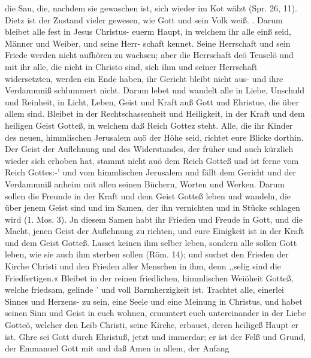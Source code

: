 die Sau, die, nachdem sie gewaschen ist, sich wieder im Kot
wälzt (Spr. 26, 11). Dietz ist der Zustand vieler gewesen, wie
Gott und sein Volk weiß. .
Darum bleibet alle fest in Jesus Christus- euerm Haupt, in
welchem ihr alle einß seid, Männer und Weiber, und seine Herr-
schaft kennet. Seine Herrschaft und sein Friede werden nicht
aufhören zu wachsen; aber die Herrschaft deö Teuselö und mit
ihr alle, die nicht in Christo sind, sich ihm und seiner Herrschaft
widersetzten, werden ein Ende haben, ihr Gericht bleibt nicht aus-
und ihre Verdammniß schlummert nicht. Darum lebet und
wandelt alle in Liebe, Unschuld und Reinheit, in Licht, Leben,
Geist und Kraft auß Gott und Ehristue, die über allem sind.
Bleibet in der Rechtschassenheit und Heiligkeit, in der Kraft und
dem heiligen Geist Gotteß, in welchem daß Reich Gottez steht.
Alle, die ihr Kinder des neuen, himmlischen Jerusalem auö der
Höhe seid, richtet eure Blicke dorthin.
Der Geist der Auflehnung und des Widerstandes, der früher
und auch kürzlich wieder sich erhoben hat, stammt nicht auö dem
Reich Gotteß und ist ferne vom Reich Gottes:-’ und vom himmlischen
Jerusalem und fällt dem Gericht und der Verdammniß anheim
mit allen seinen Büchern, Worten und Werken. Darum sollen
die Freunde in der Kraft und dem Geist Gotteß leben und wandeln,
die über jenem Geist sind und im Samen, der ihn vernichten und
in Stücke schlagen wird (1. Mos. 3). Jn diesem Samen habt ihr
Frieden und Freude in Gott, und die Macht, jenen Geist der
Auflehnung zu richten, und eure Einigkeit ist in der Kraft und
dem Geist Gotteß.
Lasset keinen ihm selber leben, sondern alle sollen Gott
leben, wie sie auch ihm sterben sollen (Röm. 14); und suchet den
Frieden der Kirche Christi und den Frieden aller Menschen in
ihm, denn ,,selig sind die Friedfertigen.« Bleibet in der reinen
friedlichen, himmlischen Weiöheit Gotteß, welche friedsam, gelinde
’ und voll Barmherzigkeit ist. Trachtet alle, einerlei Sinnes und
Herzens- zu sein, eine Seele und eine Meinung in Christus,
und habet seinen Sinn und Geist in euch wohnen, ermuntert
euch untereinander in der Liebe Gotteö, welcher den Leib Christi,
seine Kirche, erbauet, deren heiligeß Haupt er ist. Ghre sei Gott
durch Ehristuß, jetzt und immerdar; er ist der Felß und Grund,
der Emmanuel Gott mit und daß Amen in allem, der Anfang



